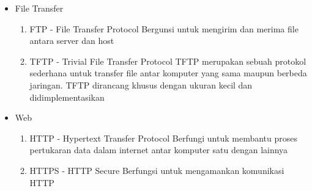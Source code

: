 \documentclass{article}
\begin{document}
\begin{flushleft}
\begin{itemize}
            \item File Transfer
            \begin{enumerate}
                \item FTP - File Transfer Protocol \newline
                Bergunsi untuk mengirim dan merima file antara server dan host

                \item TFTP - Trivial File Transfer Protocol \newline
                TFTP merupakan sebuah protokol sederhana untuk transfer file antar komputer yang sama maupun berbeda jaringan. TFTP dirancang khusus dengan ukuran kecil dan didimplementasikan
            \end{enumerate}

            \item Web
            \begin{enumerate}
                \item HTTP - Hypertext Transfer Protocol \newline
                Berfungi untuk membantu proses pertukaran data dalam internet antar komputer satu dengan lainnya

                \item HTTPS - HTTP Secure \newline
                Berfungsi untuk mengamankan komunikasi HTTP
            \end{enumerate}
        \end{itemize}
    \end{flushleft}
\end{document}
